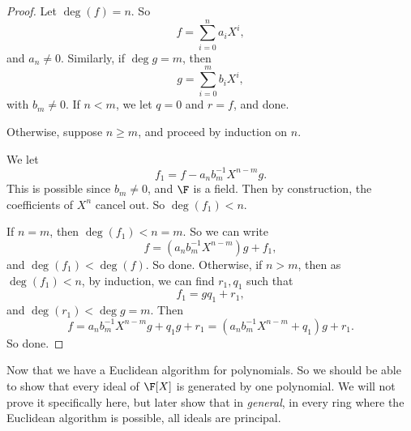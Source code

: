 \documentclass[a4paper]{article}
\begin{document}
\begin{proof}
  Let $\deg (f) = n$. So
  \[
    f = \sum_{i = 0}^n a_i X^i,
  \]
  and $a_n \not= 0$. Similarly, if $\deg g = m$, then
  \[
    g = \sum_{i = 0}^m b_i X^i,
  \]
  with $b_m \not= 0$. If $n < m$, we let $q = 0$ and $r = f$, and done.

  Otherwise, suppose $n \geq m$, and proceed by induction on $n$.

  We let
  \[
    f_1 = f - a_n b_m^{-1} X^{n - m} g.
  \]
  This is possible since $b_m \not= 0$, and $\F$ is a field. Then by construction, the coefficients of $X^n$ cancel out. So $\deg (f_1) < n$.

  If $n = m$, then $\deg (f_1) < n = m$. So we can write
  \[
    f = (a_n b_m^{-1} X^{n - m})g + f_1,
  \]
  and $\deg(f_1) < \deg(f)$. So done. Otherwise, if $n > m$, then as $\deg(f_1) < n$, by induction, we can find $r_1, q_1$ such that
  \[
    f_1 = g q_1 + r_1,
  \]
  and $\deg (r_1) < \deg g = m$. Then
  \[
    f = a_nb_m^{-1} X^{n - m} g + q_1 g + r_1 = (a_n b_m^{-1}X^{n - m} + q_1) g + r_1.
  \]
  So done.
\end{proof}
Now that we have a Euclidean algorithm for polynomials. So we should be able to show that every ideal of $\F[X]$ is generated by one polynomial. We will not prove it specifically here, but later show that in \emph{general}, in every ring where the Euclidean algorithm is possible, all ideals are principal.
\end{document}
